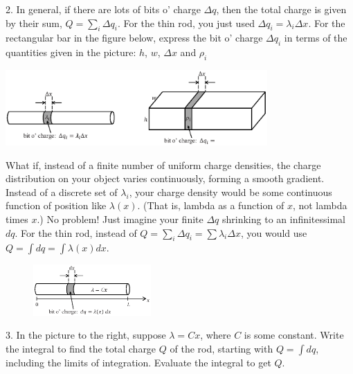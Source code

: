 2. In general, if there are lots of bits o' charge $\Delta q$, then the total charge is given by their sum, $Q = \sum_i \Delta q_i$. For the thin rod, you just used $\Delta q_i = \lambda_i \Delta x$.  For the rectangular bar in the figure below, express the bit o' charge $\Delta q_i$ in terms of the quantities given in the picture: $h$, $w$, $\Delta x$ and $\rho_i$

\vspace{-0.2 in}
\begin{center}
\includegraphics[width=0.75\textwidth]{charge_density/fig2.eps}
\end{center}
What if, instead of a finite number of uniform charge densities, the charge distribution on your object varies continuously, forming a smooth gradient. Instead of a discrete set of $\lambda_i$, your charge density would be some continuous function of position like $\lambda(x)$.  (That is, lambda as a function of $x$, not lambda times $x$.) No problem! Just imagine your finite $\Delta q$ shrinking to an infinitessimal $dq$.  For the thin rod, instead of $Q= \sum_i \Delta q_i = \sum \lambda_i \Delta x$, you would use $Q = \int dq = \int \lambda \left(x\right) dx$. 

\begin{figure}
\vspace{-0.4 in}
    \includegraphics[width=0.4\textwidth]{charge_density/fig3.eps}
\end{figure}
\vspace{0.2 in}
3. In the picture to the right, suppose $\lambda = Cx$, where $C$ is some constant. Write the integral to find the total charge $Q$ of the rod, starting with $Q = \int dq$, including the limits of integration.  Evaluate the integral to get $Q$.

